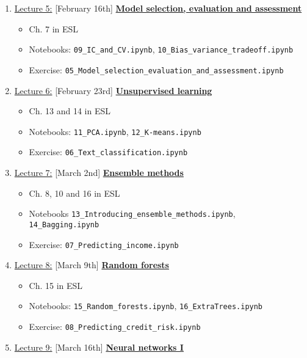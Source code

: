\documentclass[12pt, a4paper]{article}
\begin{document}
\begin{enumerate}
{\begin{itemize}
            \end{itemize}
    }
 \item[] \underline{Lecture 5:} [February 16th] \underline{\bf Model selection, evaluation and assessment}
    {\small
          \begin{itemize}
            \item Ch. 7 in ESL
            \item Notebooks: \texttt{09\_IC\_and\_CV.ipynb}, \texttt{10\_Bias\_variance\_tradeoff.ipynb}
            \item Exercise: \texttt{05\_Model\_selection\_evaluation\_and\_assessment.ipynb}
          \end{itemize}
    }
  \item[] \underline{Lecture 6:} [February 23rd] \underline{\bf Unsupervised learning}
    {\small
          \begin{itemize}
            \item Ch. 13 and 14 in ESL
            \item Notebooks: \texttt{11\_PCA.ipynb}, \texttt{12\_K-means.ipynb}
            \item Exercise: \texttt{06\_Text\_classification.ipynb}
          \end{itemize}
    }
  \item[] \underline{Lecture 7:} [March 2nd] \underline{\bf Ensemble methods}
    {\small
          \begin{itemize}
            \item Ch. 8, 10 and  16 in ESL
            \item Notebooks \texttt{13\_Introducing\_ensemble\_methods.ipynb}, \texttt{14\_Bagging.ipynb}
            \item Exercise: \texttt{07\_Predicting\_income.ipynb}
          \end{itemize}
    }
  \item[] \underline{Lecture 8:} [March 9th] \underline{\bf Random forests}
    {\small
          \begin{itemize}
            \item Ch. 15 in ESL
            \item Notebooks: \texttt{15\_Random\_forests.ipynb}, \texttt{16\_ExtraTrees.ipynb}
            \item Exercise: \texttt{08\_Predicting\_credit\_risk.ipynb}
          \end{itemize}
    }
  \item[] \underline{Lecture 9:} [March 16th] \underline{\bf Neural networks I}

\end{enumerate}
\end{document}

